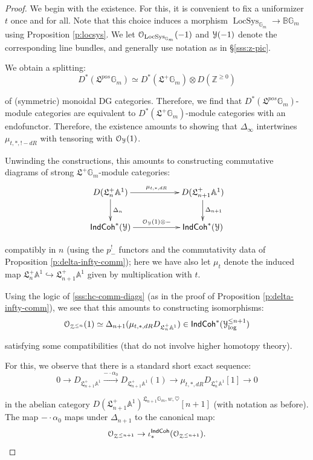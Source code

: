 \documentclass[reqno,11pt]{amsart}
\numberwithin{equation}{subsection}
\theoremstyle{remark}
\newcommand{\xar}[1]{\xrightarrow{#1}}
\newcommand{\into}{\hookrightarrow}
\newcommand{\bA}{{\mathbb A}}
\newcommand{\bB}{{\mathbb B}}
\newcommand{\bG}{{\mathbb G}}
\newcommand{\bZ}{{\mathbb Z}}
\newcommand{\sO}{{\EuScript O}}
\newcommand{\sY}{{\EuScript Y}}
\newcommand{\sZ}{{\EuScript Z}}
\newcommand{\fL}{{\mathfrak L}}
\newcommand{\on}{\operatorname}
\newcommand{\LocSys}{\on{LocSys}}
\newcommand{\heart}{\heartsuit}
\newcommand{\IndCoh}{\mathsf{IndCoh}}
\begin{document}
\begin{proof}

We begin with the existence. For this, it is convenient to fix a 
uniformizer $t$ once and for all. Note that this choice
induces a morphism $\LocSys_{\bG_m} \to \bB \bG_m$ using 
Proposition \ref{p:locsys}. We let $\sO_{\LocSys_{\bG_m}}(-1)$ and
$\sY(-1)$ denote
the corresponding line bundles, and generally use notation as in
\S \ref{sss:z-pic}. 

We obtain a splitting:
%
\[
D^*(\fL^{pos} \bG_m) \simeq D^*(\fL^+ \bG_m) \otimes D(\bZ^{\geq 0})
\]

\noindent of (symmetric) monoidal DG categories. Therefore, we find
that $D^*(\fL^{pos} \bG_m)$-module categories are equivalent to
$D^*(\fL^+\bG_m)$-module categories with an endofunctor.
Therefore, the existence amounts to showing that $\Delta_{\infty}$
intertwines $\mu_{t,*,!-dR}$ with tensoring with 
$\sO_{\sY}(1)$.

Unwinding the constructions, this amounts to constructing commutative diagrams
of strong $\fL^+\bG_m$-module categories:
%
\[
\xymatrix{
D(\fL_n^+\bA^1) \ar[rr]^{\mu_{t,*,dR}}\ar[d]^{\Delta_n} && D(\fL_{n+1}^+\bA^1) \ar[d]^{\Delta_{n+1}} \\
\IndCoh^*(\sY) \ar[rr]^{\sO_{\sY}(1) \otimes -} &&  \IndCoh^*(\sY)
}
\] 

\noindent compatibly in $n$ (using the $p_{-}^!$ functors and 
the commutativity data of Proposition \ref{p:delta-infty-comm});
here we have also let $\mu_t$ denote the induced map
$\fL_n^+\bA^1 \into \fL_{n+1}^+\bA^1$ given by multiplication with $t$.

Using the logic of \eqref{sss:hc-comm-diags} (as in 
the proof of Proposition \ref{p:delta-infty-comm}),
we see that this amounts to constructing
isomorphisms:
%
\[
\sO_{\sZ^{\leq n}}(1) \simeq \Delta_{n+1}(\mu_{t,*,dR} D_{\fL_n^+\bA^1}) \in 
\IndCoh^*(\sY_{\log}^{\leq n+1})
\]

\noindent satisfying some compatibilities (that do not involve higher
homotopy theory).

For this, we observe that there is a standard short exact sequence:
%
\[
0 \to D_{\fL_{n+1}^+\bA^1} \xar{-\cdot \alpha_0} D_{\fL_{n+1}^+\bA^1}(1) \xar{}
\mu_{t,*,dR} D_{\fL_n^+\bA^1}[1] \to 0 
\]

\noindent in the abelian category $D(\fL_{n+1}^+\bA^1)^{\fL_{n+1}\bG_m,w,\heart}[n+1]$
(with notation as before). 
The map $-\cdot \alpha_0$ maps under $\Delta_{n+1}$ to the canonical
map:
%
\[
\sO_{\sZ^{\leq n+1}} \to \iota_*^{\IndCoh}(\sO_{\sZ^{\leq n+1}}).
\]


\end{proof}
\end{document}
